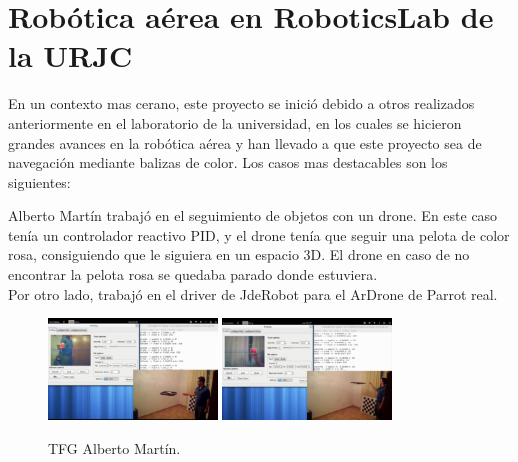	

\section{Rob\'otica a\'erea en RoboticsLab de la URJC}
\hspace{1 cm} En un contexto mas cerano, este proyecto se inici\'o debido a otros realizados anteriormente en el laboratorio de la universidad, en los cuales se hicieron grandes avances en la rob\'otica a\'erea y han llevado a que este proyecto sea de navegaci\'on mediante balizas de color. Los casos mas destacables son los siguientes:



\hspace{1 cm} Alberto Mart\'in \cite{MediaWikiAlbertoMartinFlorido} trabaj\'o en el seguimiento de objetos con un drone. En este caso ten\'ia un controlador reactivo PID, y el drone ten\'ia que seguir una pelota de color rosa, consiguiendo que le siguiera en un espacio 3D. El drone en caso de no encontrar la pelota rosa se quedaba parado donde estuviera. \\
Por otro lado, trabaj\'o en el driver de JdeRobot para el ArDrone de Parrot real. 
\begin{figure}[H]
 \centering
    \includegraphics[width=0.4\textwidth]{imgs/AlbertoMartin1_1.png}
    \includegraphics[width=0.4\textwidth]{imgs/AlbertoMartin2_1.png}
 \caption{TFG Alberto Mart\'in.}
 \label{f:AlbertoMartin}
\end{figure} 


